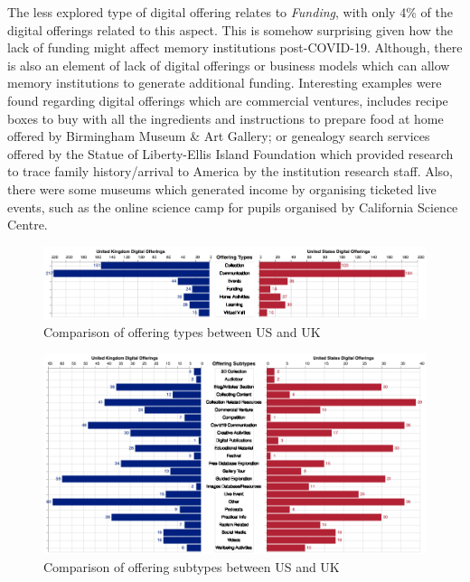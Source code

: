\documentclass{egpubl}
\begin{document}
The less explored type of digital offering relates to \emph{Funding}, with only 4\% of the digital offerings related to this aspect. This is somehow surprising given how the lack of funding might affect memory institutions post-COVID-19. Although, there is also an element of lack of digital offerings or business models which can allow memory institutions to generate additional funding. Interesting examples were found regarding digital offerings which are commercial ventures, includes recipe boxes to buy with all the ingredients and instructions to prepare food at home offered by Birmingham Museum \& Art Gallery; or genealogy search services offered by the Statue of Liberty-Ellis Island Foundation which provided research to trace family history/arrival to America by the institution research staff. Also, there were some museums which generated income by organising ticketed live events, such as the online science camp for pupils organised by California Science Centre.



\begin{figure}[h]
  \centering
  \includegraphics[width=\linewidth]{images/typecomparison.png}
  \caption{\label{fig:TypeComparison}
           Comparison of offering types between US and UK}
\end{figure}
\begin{figure}[h]
  \centering
  \includegraphics[width=\linewidth]{images/subtypecomparison.png}
  \caption{\label{fig:SubTypeComparison}
           Comparison of offering subtypes between US and UK}
\end{figure}
\end{document}
